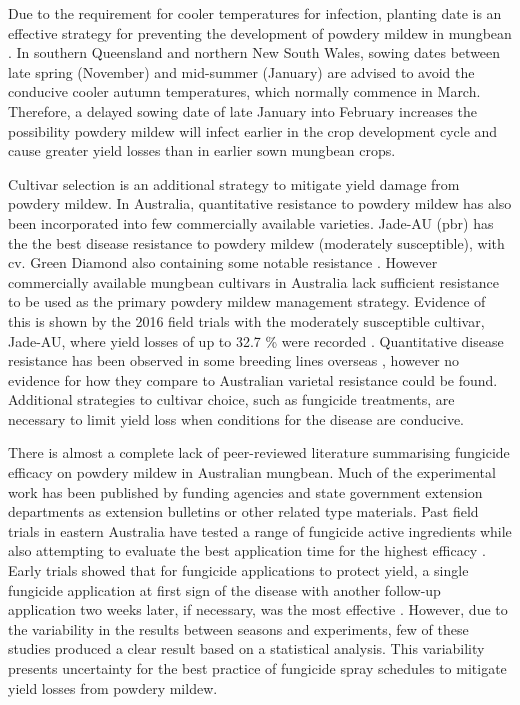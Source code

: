 \documentclass[agronomy,article,submit,moreauthors,pdftex]{mdpi}
\begin{document}
Due to the requirement for cooler temperatures for infection, planting date is an effective strategy for preventing the development of powdery mildew in mungbean \citep{AMAplanting}.
In southern Queensland and northern New South Wales, sowing dates between late spring (November) and mid-summer (January) are advised to avoid the conducive cooler autumn temperatures, which normally commence in March.
Therefore, a delayed sowing date of late January into February increases the possibility powdery mildew will infect earlier in the crop development cycle and cause greater yield losses than in earlier sown mungbean crops.

Cultivar selection is an additional strategy to mitigate yield damage from powdery mildew.
In Australia, quantitative resistance to powdery mildew has also been incorporated into few commercially available varieties.
Jade-AU {(pbr)} has the the best disease resistance to powdery mildew (moderately susceptible), with cv. Green Diamond also containing some notable resistance \citep{Sparks2017}.
However commercially available mungbean cultivars in Australia lack sufficient resistance to be used as the primary powdery mildew management strategy.
Evidence of this is shown by the 2016 field trials with the moderately susceptible cultivar, Jade-AU, where yield losses of up to 32.7 \% were recorded \citep{SueThompson2016}.
Quantitative disease resistance has been observed in some breeding lines overseas \citep{Pandey2018, Chankaew2013}, however no evidence for how they compare to Australian varietal resistance could be found.
Additional strategies to cultivar choice, such as fungicide treatments, are necessary to limit yield loss when conditions for the disease are conducive.

There is almost a complete lack of peer-reviewed literature summarising fungicide efficacy on powdery mildew in Australian mungbean.
Much of the experimental work has been published by funding agencies and state government extension departments as extension bulletins or other related type materials.
Past field trials in eastern Australia have tested a range of fungicide active ingredients while also attempting to evaluate the best application time for the highest efficacy \citep{goolhi2013, premer2013, Millmerran2013, Marysmount2013, SueThompson2016, Kelly2017a, Thompson2016}.
Early trials showed that for fungicide applications to protect yield, a single fungicide application at first sign of the disease with another follow-up application two weeks later, if necessary, was the most effective \citep{SueThompson2016, Sparks2017}.
However, due to the variability in the results between seasons and experiments, few of these studies produced a clear result based on a statistical analysis.
This variability presents uncertainty for the best practice of fungicide spray schedules to mitigate yield losses from powdery mildew.
\end{document}

